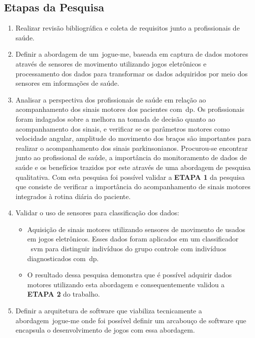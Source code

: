 \subsection{Etapas da Pesquisa}
\begin{enumerate}

\item{Realizar revisão bibliográfica e coleta de requisitos junto a profissionais de saúde.}

\item{Definir a abordagem de um~\ac{jogue-me}, baseada em captura de dados motores através de sensores de movimento utilizando jogos eletrônicos e processamento dos dados para transformar os dados adquiridos por meio dos sensores em informações de saúde.}

\item{Analisar a perspectiva dos profissionais de saúde em relação ao acompanhamento dos sinais motores dos pacientes com~\ac{dp}. Os profissionais foram indagados sobre a melhora na tomada de decisão quanto ao acompanhamento dos sinais, e verificar se os parâmetros motores como velocidade angular, amplitude do movimento dos braços são importantes para realizar o acompanhamento dos sinais parkinsonianos. Procurou-se encontrar junto ao profissional de saúde, a importância do monitoramento de dados de saúde e os benefícios trazidos por este através de uma abordagem de pesquisa qualitativa. Com esta pesquisa foi possível validar a \textbf{ETAPA 1} da pesquisa que consiste de verificar a importância do acompanhamento de sinais motores integrados à rotina diária do paciente.}

\item{Validar o uso de sensores para classificação dos dados:} 
	\begin{itemize}
		\item Aquisição de sinais motores utilizando sensores de movimento de usados em jogos eletrônicos. Esses dados foram aplicados em um classificador ~\ac{svm} para distinguir indivíduos do grupo controle com indivíduos diagnosticados com~\ac{dp}. 
		\item O resultado dessa pesquisa demonstra que é possível adquirir dados motores utilizando esta abordagem e consequentemente validou a \textbf{ETAPA 2} do trabalho.
	\end{itemize}
\item{Definir a arquitetura de software que viabiliza tecnicamente a abordagem~\ac{jogue-me} onde foi possível definir um arcabouço de software que encapsula o desenvolvimento de jogos com essa abordagem.}


\end{enumerate}
